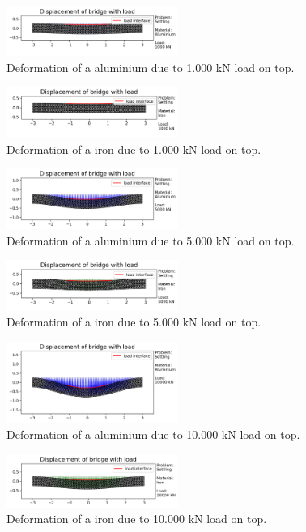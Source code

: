 \documentclass[acmtog]{acmart}
\begin{document}
\graphicspath{{Images/Week5/exp3/}}
\begin{figure}[H]
  \centering
  \includegraphics[width = 0.5\textwidth]{exp3_00.png}
  \caption{Deformation of a aluminium due to 1.000 kN load on top.\label{fig:w5exp3_0}}
\end{figure}
\begin{figure}[H]
  \centering
  \includegraphics[width = 0.5\textwidth]{exp3_01.png}
  \caption{Deformation of a iron due to 1.000 kN load on top.\label{fig:w5exp3_1}}
\end{figure}
\newpage
\begin{figure}[H]
  \centering
  \includegraphics[width = 0.5\textwidth]{exp3_10.png}
  \caption{Deformation of a aluminium due to 5.000 kN load on top.\label{fig:w5exp3_2}}
\end{figure}
\begin{figure}[H]
  \centering
  \includegraphics[width = 0.5\textwidth]{exp3_11.png}
  \caption{Deformation of a iron due to 5.000 kN load on top.\label{fig:w5exp3_3}}
\end{figure}
\begin{figure}[H]
  \centering
  \includegraphics[width = 0.5\textwidth]{exp3_20.png}
  \caption{Deformation of a aluminium due to 10.000 kN load on top.\label{fig:w5exp3_4}}
\end{figure}
\begin{figure}[H]
  \centering
  \includegraphics[width = 0.5\textwidth]{exp3_21.png}
  \caption{Deformation of a iron due to 10.000 kN load on top.\label{fig:w5exp3_5}}
\end{figure}
\end{document}
